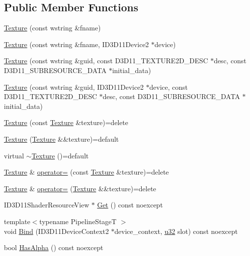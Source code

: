 \subsection*{Public Member Functions}
\begin{DoxyCompactItemize}
\item 
\hyperlink{classmage_1_1_texture_a80de233bcc89478bc1ad904430290ad3}{Texture} (const wstring \&fname)
\item 
\hyperlink{classmage_1_1_texture_a76d73e57feed31f48c49b6aa41017156}{Texture} (const wstring \&fname, I\+D3\+D11\+Device2 $\ast$device)
\item 
\hyperlink{classmage_1_1_texture_a42f351b830cfc01a95849ac67dc86965}{Texture} (const wstring \&guid, const D3\+D11\+\_\+\+T\+E\+X\+T\+U\+R\+E2\+D\+\_\+\+D\+E\+SC $\ast$desc, const D3\+D11\+\_\+\+S\+U\+B\+R\+E\+S\+O\+U\+R\+C\+E\+\_\+\+D\+A\+TA $\ast$initial\+\_\+data)
\item 
\hyperlink{classmage_1_1_texture_a3a81edb24e83ec1b99f8864f56d3fff2}{Texture} (const wstring \&guid, I\+D3\+D11\+Device2 $\ast$device, const D3\+D11\+\_\+\+T\+E\+X\+T\+U\+R\+E2\+D\+\_\+\+D\+E\+SC $\ast$desc, const D3\+D11\+\_\+\+S\+U\+B\+R\+E\+S\+O\+U\+R\+C\+E\+\_\+\+D\+A\+TA $\ast$initial\+\_\+data)
\item 
\hyperlink{classmage_1_1_texture_aed9e8ab5bc3efdeb381672fd4e243ea7}{Texture} (const \hyperlink{classmage_1_1_texture}{Texture} \&texture)=delete
\item 
\hyperlink{classmage_1_1_texture_a9297257bfe76e744cb02bbbb51f73348}{Texture} (\hyperlink{classmage_1_1_texture}{Texture} \&\&texture)=default
\item 
virtual \hyperlink{classmage_1_1_texture_a81664804ac0259e8c67851409ee106fa}{$\sim$\+Texture} ()=default
\item 
\hyperlink{classmage_1_1_texture}{Texture} \& \hyperlink{classmage_1_1_texture_a0b73b4df98d729c8f60e58b0ca065636}{operator=} (const \hyperlink{classmage_1_1_texture}{Texture} \&texture)=delete
\item 
\hyperlink{classmage_1_1_texture}{Texture} \& \hyperlink{classmage_1_1_texture_a765e9cf3bddedbe2795dea0fe57245ff}{operator=} (\hyperlink{classmage_1_1_texture}{Texture} \&\&texture)=delete
\item 
I\+D3\+D11\+Shader\+Resource\+View $\ast$ \hyperlink{classmage_1_1_texture_ac48cd0477d9771666e3929d72ee4e419}{Get} () const noexcept
\item 
{\footnotesize template$<$typename Pipeline\+StageT $>$ }\\void \hyperlink{classmage_1_1_texture_aee77169c3cdfbfbbc9ac7b06ed8a5bdd}{Bind} (I\+D3\+D11\+Device\+Context2 $\ast$device\+\_\+context, \hyperlink{namespacemage_af2b398bf98eb10351f49cad73fe2cc73}{u32} slot) const noexcept
\item 
bool \hyperlink{classmage_1_1_texture_aa795442d72c6ea0cb8137e293c95922c}{Has\+Alpha} () const noexcept
\end{DoxyCompactItemize}
